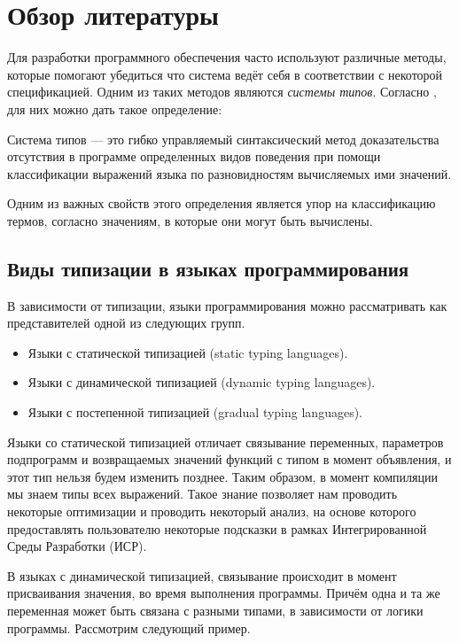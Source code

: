 \section{Обзор литературы}

Для разработки программного обеспечения часто используют различные методы, которые помогают убедиться что система ведёт себя в соответствии с некоторой спецификацией. Одним из таких методов являются \textit{системы типов}. Согласно \cite{book:pierce2002types}, для них можно дать такое определение:


\begin{definition}
Система типов --- это гибко управляемый синтаксический метод доказательства отсутствия в программе определенных видов поведения при помощи классификации выражений языка по разновидностям вычисляемых ими значений.
\end{definition}

Одним из важных свойств этого определения является упор на классификацию термов, согласно значениям, в которые они могут быть вычислены.

\subsection{Виды типизации в языках программирования}

В зависимости от типизации, языки программирования можно рассматривать как представителей одной из следующих групп.
\begin{itemize}
\item Языки с статической типизацией (static typing languages).
\item Языки с динамической типизацией (dynamic typing languages).
\item Языки с постепенной типизацией (gradual typing  languages).
\end{itemize}



Языки со статической типизацией отличает связывание переменных, параметров подпрограмм и возвращаемых значений функций с типом в момент объявления, и этот тип нельзя будем изменить позднее. Таким образом, в момент компиляции мы знаем типы всех выражений. Такое знание позволяет нам проводить некоторые оптимизации и проводить некоторый анализ, на основе которого предоставлять пользователю некоторые подсказки в рамках Интегрированной Среды Разработки (ИСР).

В языках с динамической типизацией, связывание происходит в момент присваивания  значения, во время выполнения программы. Причём одна и та же переменная может быть связана с разными типами, в зависимости от логики программы. Рассмотрим следующий пример.


